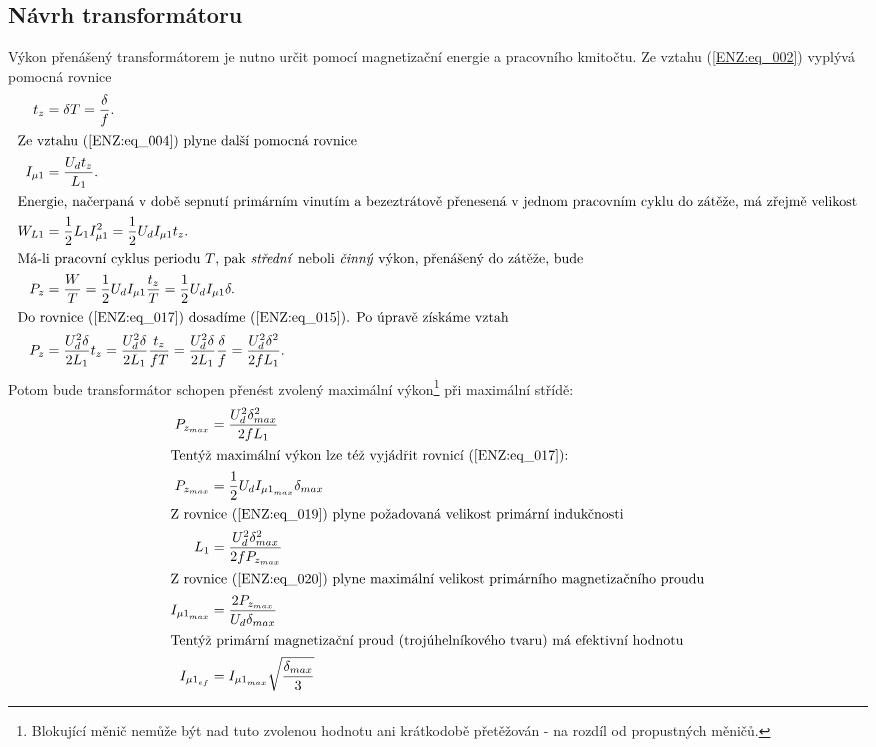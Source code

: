   \subsection{Návrh transformátoru}
    Výkon přenášený transformátorem je nutno určit pomocí magnetizační energie a pracovního 
    kmitočtu. Ze vztahu (\ref{ENZ:eq_002}) vyplývá pomocná rovnice
    \begin{align}
      t_z      &= \delta T = \frac{\delta}{f}.         \label{ENZ:eq_014} \\ 
      \shortintertext{Ze vztahu (\ref{ENZ:eq_004}) plyne další pomocná rovnice} 
      I_{\mu1} &= \frac{U_d t_z}{L_1}.                 \label{ENZ:eq_015} \\ 
      \shortintertext{Energie, načerpaná v době sepnutí primárním vinutím a bezeztrátově 
                      přenesená v jednom pracovním cyklu do zátěže, má zřejmě velikost}
      W_{L1}   &= \frac{1}{2}L_1I_{\mu1}^2 
                = \frac{1}{2}U_dI_{\mu1}t_z.           \label{ENZ:eq_016} \\
      \shortintertext{Má-li pracovní cyklus periodu \(T\), pak \emph{střední} neboli \emph{činný} 
                      výkon, přenášený do zátěže, bude}
      P_z      &= \frac{W}{T} = \frac{1}{2}U_dI_{\mu1}\frac{t_z}{T} 
                = \frac{1}{2}U_dI_{\mu1}\delta.        \label{ENZ:eq_017} \\
      \shortintertext{Do rovnice (\ref{ENZ:eq_017}) dosadíme (\ref{ENZ:eq_015}). Po úpravě 
                     získáme vztah}
      P_z      &= \frac{U_d^2\delta}{2L_1}t_z
                = \frac{U_d^2\delta}{2L_1}\frac{t_z}{fT}
                = \frac{U_d^2\delta}{2L_1}\frac{\delta}{f}
                = \frac{U_d^2\delta^2}{2fL_1}.          \label{ENZ:eq_018}
    \end{align}
    Potom bude transformátor schopen přenést zvolený maximální výkon\footnote{Blokující měnič 
    nemůže být nad tuto zvolenou hodnotu ani krátkodobě přetěžován - na rozdíl od propustných 
    měničů.} při maximální střídě:
    \begin{align}
      P_{z_{max}} &= \frac{U_d^2\delta_{max}^2}{2fL_1}           \label{ENZ:eq_019} \\ 
      \shortintertext{Tentýž maximální výkon lze též vyjádřit rovnicí (\ref{ENZ:eq_017}):}
      P_{z_{max}} &= \frac{1}{2}U_d I_{{\mu1}_{max}}\delta_{max} \label{ENZ:eq_020} \\
      \shortintertext{Z rovnice (\ref{ENZ:eq_019}) plyne požadovaná velikost primární indukčnosti}
      L_1         &= \frac{U_d^2\delta_{max}^2}{2fP_{z_{max}}}   \label{ENZ:eq_021} \\
      \shortintertext{Z rovnice (\ref{ENZ:eq_020}) plyne maximální velikost primárního 
                      magnetizačního proudu}
      I_{{\mu1}_{max}} &= \frac{2P_{z_{max}}}{U_d\delta_{max}}   \label{ENZ:eq_022} \\
      \shortintertext{Tentýž primární magnetizační proud (trojúhelníkového tvaru) má efektivní 
                      hodnotu}
      I_{{\mu1}_{ef}} &= I_{{\mu1}_{max}}\sqrt{\frac{\delta_{max}}{3}} \label{ENZ:eq_023}
    \end{align}
